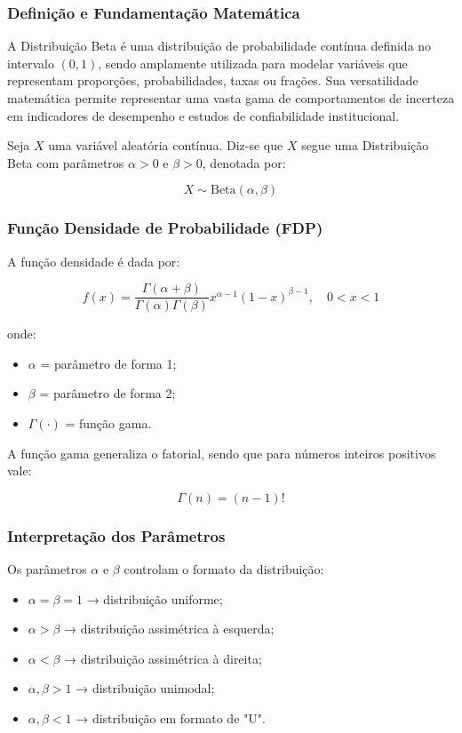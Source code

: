 \subsubsection{Definição e Fundamentação Matemática} 

A Distribuição Beta é uma distribuição de probabilidade contínua definida no intervalo $(0,1)$, sendo amplamente utilizada para modelar variáveis que representam proporções, probabilidades, taxas ou frações. Sua versatilidade matemática permite representar uma vasta gama de comportamentos de incerteza em indicadores de desempenho e estudos de confiabilidade institucional. \vskip0.3cm


Seja $X$ uma variável aleatória contínua. Diz-se que $X$ segue uma Distribuição Beta com parâmetros $\alpha > 0$ e $\beta > 0$, denotada por:

\[
X \sim \text{Beta}(\alpha, \beta)
\]

\subsubsection{Função Densidade de Probabilidade (FDP)}

A função densidade é dada por:

\[
f(x) =
\frac{\Gamma(\alpha + \beta)}
{\Gamma(\alpha)\Gamma(\beta)}
x^{\alpha - 1}(1 - x)^{\beta - 1},
\quad 0 < x < 1
\]

onde:

\begin{itemize}
\item $\alpha$ = parâmetro de forma 1;
\item $\beta$ = parâmetro de forma 2;
\item $\Gamma(\cdot)$ = função gama.
\end{itemize}

A função gama generaliza o fatorial, sendo que para números inteiros positivos vale:

\[
\Gamma(n) = (n-1)!
\]

\subsubsection{Interpretação dos Parâmetros}

Os parâmetros $\alpha$ e $\beta$ controlam o formato da distribuição:

\begin{itemize}
\item $\alpha = \beta = 1$ → distribuição uniforme;
\item $\alpha > \beta$ → distribuição assimétrica à esquerda;
\item $\alpha < \beta$ → distribuição assimétrica à direita;
\item $\alpha, \beta > 1$ → distribuição unimodal;
\item $\alpha, \beta < 1$ → distribuição em formato de "U".
\end{itemize}

